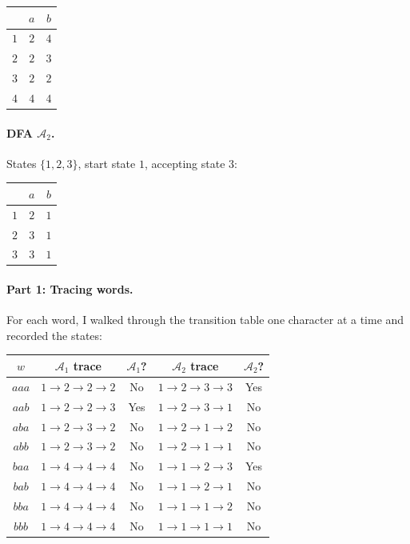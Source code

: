 \documentclass{article}
\theoremstyle{theorem}
\theoremstyle{definition}
\theoremstyle{remark}
\begin{document}
\begin{center}
\begin{tabular}{c|cc}
 & $a$ & $b$ \\ \hline
$1$ & $2$ & $4$ \\
$2$ & $2$ & $3$ \\
$3$ & $2$ & $2$ \\
$4$ & $4$ & $4$ \\
\end{tabular}
\end{center}

\paragraph{DFA $\mathcal{A}_2$.} States $\{1, 2, 3\}$, start state $1$, accepting state $3$:

\begin{center}
\begin{tabular}{c|cc}
 & $a$ & $b$ \\ \hline
$1$ & $2$ & $1$ \\
$2$ & $3$ & $1$ \\
$3$ & $3$ & $1$ \\
\end{tabular}
\end{center}

\paragraph{Part 1: Tracing words.} For each word, I walked through the transition table one character at a time and recorded the states:

\begin{center}
\begin{tabular}{c|c|c|c|c}
$w$ & $\mathcal{A}_1$ trace & $\mathcal{A}_1$? & $\mathcal{A}_2$ trace & $\mathcal{A}_2$? \\ \hline
$aaa$ & $1 \to 2 \to 2 \to 2$ & No & $1 \to 2 \to 3 \to 3$ & Yes \\
$aab$ & $1 \to 2 \to 2 \to 3$ & Yes & $1 \to 2 \to 3 \to 1$ & No \\
$aba$ & $1 \to 2 \to 3 \to 2$ & No & $1 \to 2 \to 1 \to 2$ & No \\
$abb$ & $1 \to 2 \to 3 \to 2$ & No & $1 \to 2 \to 1 \to 1$ & No \\
$baa$ & $1 \to 4 \to 4 \to 4$ & No & $1 \to 1 \to 2 \to 3$ & Yes \\
$bab$ & $1 \to 4 \to 4 \to 4$ & No & $1 \to 1 \to 2 \to 1$ & No \\
$bba$ & $1 \to 4 \to 4 \to 4$ & No & $1 \to 1 \to 1 \to 2$ & No \\
$bbb$ & $1 \to 4 \to 4 \to 4$ & No & $1 \to 1 \to 1 \to 1$ & No \\
\end{tabular}
\end{center}
\end{document}
